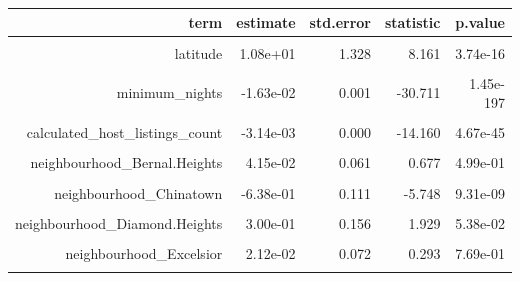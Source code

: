 \documentclass[justified, 11pt]{scrartcl}\usepackage[]{graphicx}\usepackage[]{xcolor}
\newenvironment{knitrout}{}{} %
\begin{document}
\begin{knitrout}
\begin{table}
\begin{tabular}{r|r|r|r|r}
\hline
term & estimate & std.error & statistic & p.value\\
\hline
\cellcolor{gray!6}{(Intercept)} & \cellcolor{gray!6}{8.77e+01} & \cellcolor{gray!6}{134.462} & \cellcolor{gray!6}{0.653} & \cellcolor{gray!6}{5.14e-01}\\
\hline
latitude & 1.08e+01 & 1.328 & 8.161 & 3.74e-16\\
\hline
\cellcolor{gray!6}{longitude} & \cellcolor{gray!6}{4.01e+00} & \cellcolor{gray!6}{0.959} & \cellcolor{gray!6}{4.184} & \cellcolor{gray!6}{2.88e-05}\\
\hline
minimum\_nights & -1.63e-02 & 0.001 & -30.711 & 1.45e-197\\
\hline
\cellcolor{gray!6}{number\_of\_reviews} & \cellcolor{gray!6}{-1.30e-03} & \cellcolor{gray!6}{0.000} & \cellcolor{gray!6}{-16.993} & \cellcolor{gray!6}{8.12e-64}\\
\hline
calculated\_host\_listings\_count & -3.14e-03 & 0.000 & -14.160 & 4.67e-45\\
\hline
\cellcolor{gray!6}{availability\_365} & \cellcolor{gray!6}{-2.36e-04} & \cellcolor{gray!6}{0.000} & \cellcolor{gray!6}{-4.498} & \cellcolor{gray!6}{6.96e-06}\\
\hline
neighbourhood\_Bernal.Heights & 4.15e-02 & 0.061 & 0.677 & 4.99e-01\\
\hline
\cellcolor{gray!6}{neighbourhood\_Castro.Upper.Market} & \cellcolor{gray!6}{1.55e-01} & \cellcolor{gray!6}{0.087} & \cellcolor{gray!6}{1.781} & \cellcolor{gray!6}{7.50e-02}\\
\hline
neighbourhood\_Chinatown & -6.38e-01 & 0.111 & -5.748 & 9.31e-09\\
\hline
\cellcolor{gray!6}{neighbourhood\_Crocker.Amazon} & \cellcolor{gray!6}{2.45e-01} & \cellcolor{gray!6}{0.101} & \cellcolor{gray!6}{2.433} & \cellcolor{gray!6}{1.50e-02}\\
\hline
neighbourhood\_Diamond.Heights & 3.00e-01 & 0.156 & 1.929 & 5.38e-02\\
\hline
\cellcolor{gray!6}{neighbourhood\_Downtown.Civic.Center} & \cellcolor{gray!6}{-4.94e-01} & \cellcolor{gray!6}{0.094} & \cellcolor{gray!6}{-5.245} & \cellcolor{gray!6}{1.59e-07}\\
\hline
neighbourhood\_Excelsior & 2.12e-02 & 0.072 & 0.293 & 7.69e-01\\
\hline
\cellcolor{gray!6}{neighbourhood\_Financial.District} & \cellcolor{gray!6}{-1.04e-01} & \cellcolor{gray!6}{0.102} & \cellcolor{gray!6}{-1.021} & \cellcolor{gray!6}{3.07e-01}\\

\end{tabular}
\end{table}
\end{knitrout}
\end{document}
